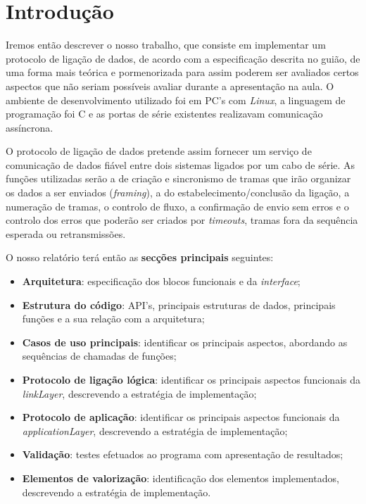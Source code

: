 \documentclass[11pt]{article}
\begin{document}
\section{Introdução}

Iremos então descrever o nosso trabalho, que consiste em implementar um protocolo de  ligação de dados, de acordo com a especificação descrita no guião, de uma forma mais teórica e pormenorizada para assim poderem ser avaliados certos aspectos que não seriam possíveis avaliar durante a apresentação na aula. 
O ambiente de desenvolvimento utilizado foi em PC's com \textit{Linux}, a linguagem de programação foi C e as portas de série existentes realizavam comunicação assíncrona. 
\par O protocolo de  ligação de dados pretende assim fornecer um serviço de comunicação de dados fiável entre dois sistemas ligados por um cabo de série. As funções utilizadas serão a de criação e sincronismo de tramas que irão organizar os dados a ser enviados (\textit{framing}), a do estabelecimento/conclusão da ligação, a numeração de tramas, o controlo de fluxo, a confirmação de envio sem erros e o controlo dos erros que poderão ser criados por \textit{timeouts}, tramas fora da sequência esperada ou retransmissões. 
\par O nosso relatório terá então as \textbf{secções principais} seguintes:

\begin{itemize}
	\item \textbf{Arquitetura}: especificação dos blocos funcionais e da \textit{interface};
	\item \textbf{Estrutura do código}: API's, principais estruturas de dados, principais funções e a sua relação com a arquitetura;
	\item \textbf{Casos de uso principais}: identificar os principais aspectos, abordando as sequências de chamadas de funções;
	\item \textbf{Protocolo de ligação lógica}: identificar os principais aspectos funcionais da \textit{linkLayer}, descrevendo a estratégia de implementação;
	\item \textbf{Protocolo de aplicação}:  identificar os principais aspectos funcionais da \textit{applicationLayer}, descrevendo a estratégia de implementação;
	\item \textbf{Validação}: testes efetuados ao programa com apresentação de resultados;
	\item \textbf{Elementos de valorização}: identificação dos elementos implementados, descrevendo a estratégia de implementação.
\end{itemize}
\end{document}
